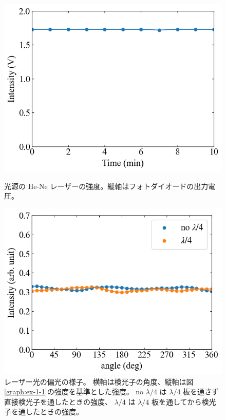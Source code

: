 \documentclass[9pt,dvipdfmx,a4paper]{jsarticle}
\begin{document}
\begin{figure}[H]
    \centering
    \begin{minipage}[t]{0.48\columnwidth}
        \centering
        \includegraphics[width=\columnwidth]{11_29_00.png}
        \caption{光源の He-Ne レーザーの強度。縦軸はフォトダイオードの出力電圧。}
        \label{graph:ex-1-1}
    \end{minipage}
    \hfill
    \begin{minipage}[t]{0.48\columnwidth}
        \centering
        \includegraphics[width=\columnwidth]{11_29_01.png}
        \caption{レーザー光の偏光の様子。
        横軸は検光子の角度、縦軸は図\ref{graph:ex-1-1}の強度を基準とした強度。
        no \(\lambda/4\) は \(\lambda/4\) 板を通さず直接検光子を通したときの強度、
        \(\lambda/4\) は \(\lambda/4\) 板を通してから検光子を通したときの強度。}
        \label{graph:ex-1-2}
    \end{minipage}
\end{figure}
\end{document}

